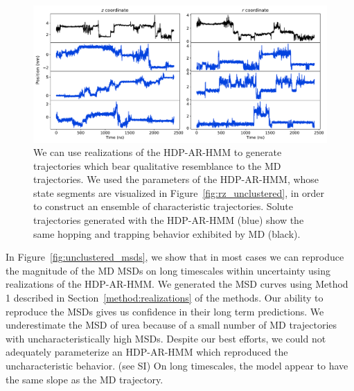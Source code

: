 \documentclass[journal=jpcbfk,manuscript=article]{achemso}
\begin{document}
  \begin{figure}
  \centering
  \includegraphics[width=\textwidth]{qualitative_unclustered_MET2.pdf}
  \caption{We can use realizations of the HDP-AR-HMM to generate trajectories which 
  bear qualitative resemblance to the MD trajectories. We used the parameters 
  of the HDP-AR-HMM, whose state segments are visualized in 
  Figure~\ref{fig:rz_unclustered}, in order to construct an ensemble of 
  characteristic trajectories. Solute trajectories generated with
  the HDP-AR-HMM (blue) show the same hopping and trapping behavior exhibited by 
  MD (black).
  }\label{fig:qualitative_unclustered}
  \end{figure}
  
  In Figure~\ref{fig:unclustered_msds}, we show that in most cases we can 
  reproduce the magnitude of the MD MSDs on long timescales within uncertainty
  using realizations of the HDP-AR-HMM. We generated the MSD curves using Method
  1 described in Section~\ref{method:realizations} of the methods. Our ability
  to reproduce the MSDs gives us confidence in their long term predictions.
  We underestimate the MSD of urea because of a small number of MD trajectories
  with uncharacteristically high MSDs. Despite our best efforts, we could not 
  adequately parameterize an HDP-AR-HMM which reproduced the uncharacteristic
  behavior. (see SI)  %
  On long timescales, the model appear to have the same slope as the MD 
  trajectory.
  
\end{document}
